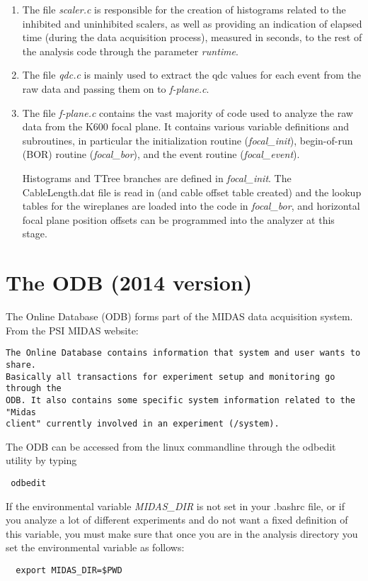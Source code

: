 \documentclass[11pt]{report}
\begin{document}
\begin{enumerate}

\item The file {\it scaler.c} is responsible for the creation of histograms
related to the inhibited and uninhibited scalers, as well as providing an indication
of elapsed time (during the data acquisition process), measured in seconds,
to the rest of the analysis code through the parameter {\it runtime}.

\item The file {\it qdc.c} is mainly used to extract the qdc values for each event
from the raw data and passing them on to {\it f-plane.c}.

\item The file {\it f-plane.c} contains the vast majority of code used to analyze
the raw data from the K600 focal plane.
It contains various variable definitions and subroutines, in particular the
initialization routine ({\it focal\_init}),
begin-of-run (BOR) routine ({\it focal\_bor}), 
and  
the event routine ({\it focal\_event}).

Histograms and TTree branches are defined in {\it focal\_init}.
The CableLength.dat file is read in (and cable offset table created)
and the lookup tables for the wireplanes are loaded into the code
in {\it focal\_bor}, and horizontal focal plane position offsets can
be programmed into the analyzer at this stage.


\end{enumerate}


\section{The ODB (2014 version)}\label{sec:ODB}

The Online Database (ODB) forms part of the MIDAS data acquisition system.
From the PSI MIDAS website:
\begin{verbatim}
The Online Database contains information that system and user wants to share. 
Basically all transactions for experiment setup and monitoring go through the 
ODB. It also contains some specific system information related to the "Midas 
client" currently involved in an experiment (/system).
\end{verbatim}
The ODB can be accessed from the linux commandline through the odbedit utility by typing
\begin{verbatim} odbedit \end{verbatim}
If the environmental variable {\it MIDAS\_DIR} is not set in your .bashrc file, or 
if you analyze a lot of different experiments and do not want a fixed definition
of this variable, you must make sure that once you are in the analysis directory
you set the environmental variable as follows:
\begin{verbatim}  export MIDAS_DIR=$PWD  \end{verbatim}
\end{document}
